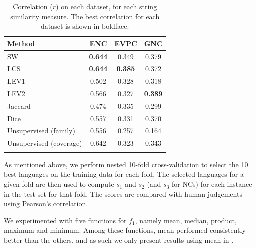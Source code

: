 \documentclass[output=paper,modfonts,nonflat]{langsci/langscibook}
\begin{document}
\begin{table}[t]

\begin{tabular}{lccc}
\lsptoprule
Method  & ENC   & EVPC  & GNC   \\
\midrule
SW   & \textbf{0.644} & 0.349 & 0.379 \\
LCS  & \textbf{0.644} & \textbf{0.385} & 0.372 \\
LEV1 & 0.502 & 0.328 & 0.318 \\
LEV2 & 0.566 & 0.327 & \textbf{0.389} \\
Jaccard& 0.474 & 0.335 & 0.299\\
Dice & 0.557 & 0.331 & 0.370\\
\midrule
Unsupervised (family) & 0.556 & 0.257 & 0.164 \\
Unsupervised (coverage) & 0.642 & 0.323 & 0.343 \\
\lspbottomrule
\end{tabular}
\caption{Correlation ($r$) on each dataset, for
  each string similarity measure. The best correlation for each
  dataset is shown in boldface.}
\label{tab:stringsimresults}

\end{table}

As mentioned above, we perform nested 10-fold cross-validation to
select the 10 best languages on the training data for each fold. The
selected languages for a given fold are then used to compute $s_1$ and
$s_2$ (and $s_3$ for NCs) for each instance in the test set for that
fold.  The scores are compared with human judgements using Pearson's
correlation.  

We experimented with five functions for $f_1$, namely mean, median,
product, maximum and minimum. Among these functions, mean performed
consistently better than the others, and as such we only present results
using mean in .

\end{document}
